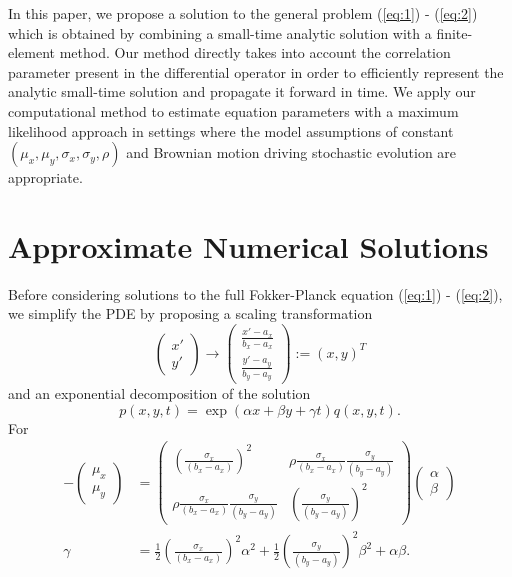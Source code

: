 \documentclass[10pt]{article}
\begin{document}
In this paper, we propose a solution to the general problem
(\ref{eq:1}) - (\ref{eq:2}) which is obtained by combining a
small-time analytic solution with a finite-element method. Our method
directly takes into account the correlation parameter present in the
differential operator in order to efficiently represent the analytic
small-time solution and propagate it forward in time. We apply our
computational method to estimate equation parameters with a maximum
likelihood approach in settings where the model assumptions of
constant $(\mu_x, \mu_y, \sigma_x, \sigma_y, \rho)$ and Brownian
motion driving stochastic evolution are appropriate.


\section{Approximate Numerical Solutions}
Before considering solutions to the full Fokker-Planck equation
(\ref{eq:1}) - (\ref{eq:2}), we simplify the PDE by proposing a
scaling transformation
\[
  \left(\begin{array}{c} x'\\ y'\end{array}\right) \to
  \left( \begin{array}{c} \frac{x' - a_x}{b_x-a_x} \\ \frac{y' -
        a_y}{b_y-a_y} \end{array} \right) := (x, y)^{T}
\]
and an exponential decomposition of the solution
\[
  p(x,y,t) = \exp(\alpha x + \beta y + \gamma t) q(x,y,t).
\]
For
\begin{align*}
  -\left( \begin{array}{c}
            \mu_x \\
            \mu_y
          \end{array} \right) &= \left( \begin{array}{cc}
                                         \left( \frac{\sigma_x}{(b_x-a_x)} \right)^2 & \rho\frac{\sigma_x}{(b_x-a_x)} \frac{\sigma_y}{(b_y-a_y)} \\
                                         \rho\frac{\sigma_x}{(b_x-a_x)} \frac{\sigma_y}{(b_y-a_y)} & \left(\frac{\sigma_y}{(b_y-a_y)}\right)^2
                                       \end{array} \right) \left( \begin{array}{c}
                                                                    \alpha \\
                                                                    \beta
                                                                  \end{array} \right) \\
  \gamma &= \frac{1}{2}\left( \frac{\sigma_x}{(b_x-a_x)} \right)^2 \alpha^2 + \frac{1}{2}\left(\frac{\sigma_y}{(b_y-a_y)}\right)^2 \beta^2 + \alpha\beta.
\end{align*}
\end{document}
